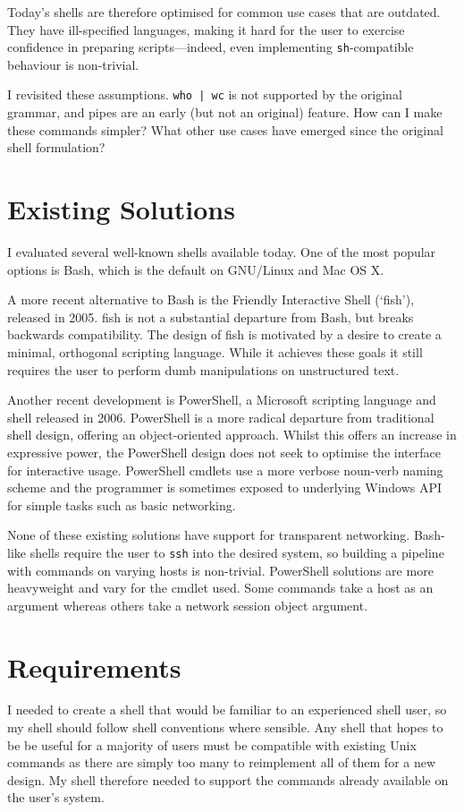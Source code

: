 \documentclass[12pt,twoside,notitlepage]{report}
\begin{document}
Today's shells are therefore optimised for common use cases that are
outdated. They have ill-specified languages, making it hard for the user to
exercise confidence in preparing scripts---indeed, even implementing
\texttt{sh}-compatible behaviour is non-trivial\cite{bourne}.

I revisited these assumptions. \texttt{who | wc} is not supported by the
original grammar, and pipes are an early (but not an original) feature. How can
I make these commands simpler? What other use cases have emerged since the
original shell formulation?

\section{Existing Solutions}
I evaluated several well-known shells available today. One of the most popular
options is Bash, which is the default on GNU/Linux and Mac OS X.

A more recent alternative to Bash is the Friendly Interactive Shell (`fish'),
released in 2005. fish is not a substantial departure from Bash, but breaks
backwards compatibility. The design of fish\cite{fishdesign} is motivated by a
desire to create a minimal, orthogonal scripting language. While it achieves
these goals it still requires the user to perform dumb manipulations on
unstructured text.

Another recent development is PowerShell, a Microsoft scripting language and
shell released in 2006. PowerShell is a more radical departure from traditional
shell design, offering an object-oriented approach. Whilst this offers an
increase in expressive power, the PowerShell design does not seek to optimise
the interface for interactive usage. PowerShell cmdlets use a more verbose
noun-verb naming scheme and the programmer is sometimes exposed to underlying
Windows API for simple tasks such as basic networking.

None of these existing solutions have support for transparent
networking. Bash-like shells require the user to {\tt ssh} into the desired
system, so building a pipeline with commands on varying hosts is
non-trivial. PowerShell solutions are more heavyweight and vary for the cmdlet
used. Some commands take a host as an argument whereas others take a network
session object argument.

\section{Requirements}
I needed to create a shell that would be familiar to an experienced shell user,
so my shell should follow shell conventions where sensible. Any shell that hopes
to be be useful for a majority of users must be compatible with existing Unix
commands as there are simply too many to reimplement all of them for a new
design. My shell therefore needed to support the commands already available on
the user's system.
\end{document}
